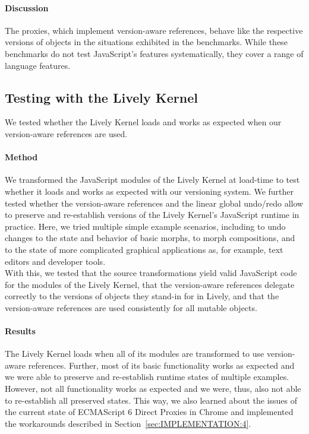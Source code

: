\paragraph{Discussion}
The proxies, which implement version-aware references, behave like the respective versions of objects in the situations exhibited in the benchmarks.
While these benchmarks do not test JavaScript's features systematically, they cover a range of language features.


\subsection{Testing with the Lively Kernel}

We tested whether the Lively Kernel loads and works as expected when our version-aware references are used.

\paragraph{Method}
We transformed the JavaScript modules of the Lively Kernel at load-time to test whether it loads and works as expected with our versioning system.
We further tested whether the version-aware references and the linear global undo/redo allow to preserve and re-establish versions of the Lively Kernel's JavaScript runtime in practice.
Here, we tried multiple simple example scenarios, including to undo changes to the state and behavior of basic morphs, to morph compositions, and to the state of more complicated graphical applications as, for example, text editors and developer tools.\\
With this, we tested that the source transformations yield valid JavaScript code for the modules of the Lively Kernel, that the version-aware references delegate correctly to the versions of objects they stand-in for in Lively, and that the version-aware references are used consistently for all mutable objects.


\paragraph{Results}
The Lively Kernel loads when all of its modules are transformed to use version-aware references.
Further, most of its basic functionality works as expected and we were able to preserve and re-establish runtime states of multiple examples.
However, not all functionality works as expected and we were, thus, also not able to re-establish all preserved states. 
This way, we also learned about the issues of the current state of ECMAScript 6 Direct Proxies in Chrome and implemented the workarounds described in Section~\ref{sec:IMPLEMENTATION:4}.

